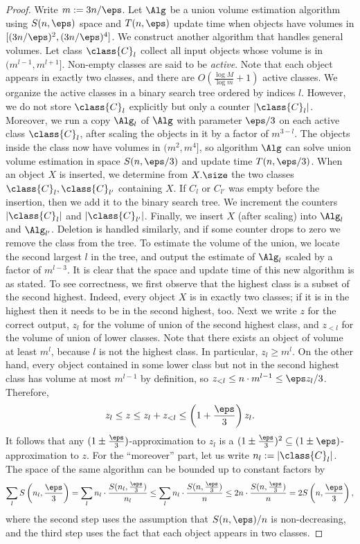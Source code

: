 \begin{proof}
    Write $m := 3n/\eps$. Let $\Alg$ be a union volume estimation algorithm using $S(n,\eps)$ space and $T(n,\eps)$ update time when objects have volumes in $[(3n/\eps)^2, (3n/\eps)^4]$. We construct another algorithm that handles general volumes.
%
    Let class $\class{C}_l$ collect all input objects whose volume is in $(m^{l-1}, m^{l+1}]$. Non-empty classes are said to be \emph{active}. Note that each object appears in exactly two classes, and there are $O(\frac{\log M}{\log m} + 1)$ active classes. We organize the active classes in a binary search tree ordered by indices $l$. However, we do not store $\class{C}_l$ explicitly but only a counter $|\class{C}_l|$. Moreover, we run a copy $\Alg_l$ of $\Alg$ with parameter $\eps/3$ on each active class $\class{C}_l$, after scaling the objects in it by a factor of $m^{3-l}$. The objects inside the class now have volumes in $(m^2, m^4]$, so algorithm $\Alg$ can solve union volume estimation in space $S(n,\eps/3)$ and update time $T(n,\eps/3)$.
%
    When an object $X$ is inserted, we determine from $X.\size$ the two classes $\class{C}_l, \class{C}_{l'}$ containing $X$. If $C_l$ or $C_{l'}$ was empty before the insertion, then we add it to the binary search tree. We increment the counters $|\class{C}_l|$ and $|\class{C}_{l'}|$. Finally, we insert $X$ (after scaling) into $\Alg_l$ and $\Alg_{l'}$. Deletion is handled similarly, and if some counter drops to zero we remove the class from the tree. To estimate the volume of the union, we locate the second largest $l$ in the tree, and output the estimate of $\Alg_l$ scaled by a factor of $m^{l-3}$.
%
    It is clear that the space and update time of this new algorithm is as stated. To see correctness, we first observe that the highest class is a subset of the second highest. Indeed, every object $X$ is in exactly two classes; if it is in the highest then it needs to be in the second highest, too.
    Next we write $z$ for the correct output, $z_l$ for the volume of union of the second highest class, and $z_{<l}$ for the volume of union of lower classes. Note that there exists an object of volume at least $m^l$, because $l$ is not the highest class. In particular, $z_l \geq m^l$. On the other hand, every object contained in some lower class but not in the second highest class has volume at most $m^{l-1}$ by definition, so $z_{<l} \leq n \cdot m^{l-1} \leq \eps z_l/3$. Therefore,
    \[ z_l \leq z \leq z_l + z_{<l} \leq \left( 1+\frac{\eps}{3} \right) z_l. \]
    It follows that any $(1\pm\frac{\eps}{3})$-approximation to $z_l$ is a $(1\pm\frac{\eps}{3})^2 \subseteq(1\pm\eps)$-approximation to $z$.
%
    For the ``moreover'' part, let us write $n_l := |\class{C}_l|$. The space of the same algorithm can be bounded up to constant factors by
    \[
        \sum_l S \left( n_l, \frac{\eps}{3} \right)
        = \sum_l n_l \cdot \frac{S(n_l, \frac{\eps}{3})}{n_l}
        \leq \sum_l n_l \cdot \frac{S(n, \frac{\eps}{3})}{n}
        \leq 2 n \cdot \frac{S(n, \frac{\eps}{3})}{n}
        = 2 S\left( n, \frac{\eps}{3} \right),
    \]
    where the second step uses the assumption that $S(n,\eps)/n$ is non-decreasing, and the third step uses the fact that each object appears in two classes.
\end{proof}
%
